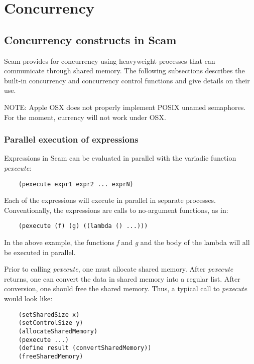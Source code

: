 \chapter{Concurrency}
\label{Concurrency}

\section{Concurrency constructs in Scam}

Scam provides for concurrency using heavyweight processes that
can communicate through shared memory. The following subsections
describes the built-in concurrency and concurrency control
functions and give details on
their use.

NOTE: Apple OSX does not properly implement POSIX unamed semaphores. For
the moment, currency will not work under OSX.

\subsection{Parallel execution of expressions}

Expressions in Scam can be evaluated in parallel with the variadic function
{\it pexecute}:

\begin{verbatim}
    (pexecute expr1 expr2 ... exprN)
\end{verbatim}

Each of the expressions will execute in parallel in separate processes.
Conventionally, the expressions are calls to no-argument functions, as in:

\begin{verbatim}
    (pexecute (f) (g) ((lambda () ...)))
\end{verbatim}

In the above example, the functions {\it f} and {\it g}
and the body of the lambda
will all be executed in parallel.

Prior to calling {\it pexecute}, one must allocate shared memory.
After {\it pexecute} returns, one can convert the data in shared memory into
a regular list. After conversion, one should free the shared memory.
Thus, a typical call to {\it pexecute} would look like:

\begin{verbatim}
    (setSharedSize x)
    (setControlSize y)
    (allocateSharedMemory)
    (pexecute ...)
    (define result (convertSharedMemory))
    (freeSharedMemory)
\end{verbatim}
    

